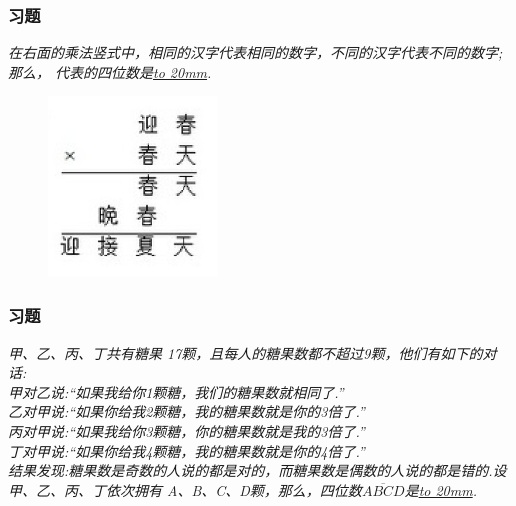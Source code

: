 \begin{frame}
    \frametitle{习题\theframecounter}
    \textit{在右面的乘法竖式中，相同的汉字代表相同的数字，不同的汉字代表不同的数字;那么， 代表的四位数是\underline{\hbox to 20mm{}}.}
    \begin{figure}[H] 
        \centering
        \includegraphics[width=0.4\textwidth]{./pics/Chapter_7/14.png}
    \end{figure}
\end{frame}

\begin{frame}
    \frametitle{习题\theframecounter}
    \textit{甲、乙、丙、丁共有糖果 17颗，且每人的糖果数都不超过9颗，他们有如下的对话:\\
    甲对乙说:``如果我给你1颗糖，我们的糖果数就相同了.''\\
    乙对甲说:``如果你给我2颗糖，我的糖果数就是你的3倍了.''\\
    丙对甲说:``如果我给你3颗糖，你的糖果数就是我的3倍了.''\\
    丁对甲说:``如果你给我4颗糖，我的糖果数就是你的4倍了.''\\
    结果发现:糖果数是奇数的人说的都是对的，而糖果数是偶数的人说的都是错的.设甲、乙、丙、丁依次拥有 A、B、C、D颗，那么，四位数$\overline{ABCD}$是\underline{\hbox to 20mm{}}.}
\end{frame}